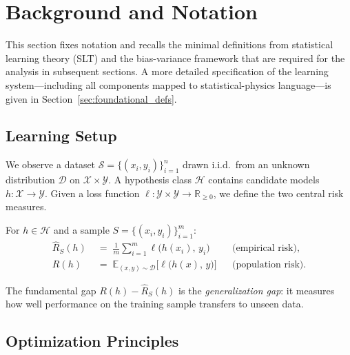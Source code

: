 \documentclass[
  journal=largetwo,
  simfonts=false,
  year=2025,
  volume=37,
]{cup-journal}
\begin{document}

\section{Background and Notation}\label{sec:background}

This section fixes notation and recalls the minimal definitions from statistical learning theory (SLT) \cite{Vapnik1999-VAPTNO,STL_Hajek_Maxim_2021} and the bias-variance framework that are required for the analysis in subsequent sections. A more detailed specification of the learning system---including all components mapped to statistical-physics language---is given in Section~\ref{sec:foundational_defs}.

\subsection{Learning Setup}

We observe a dataset $\mathcal{S}=\{(x_i,y_i)\}_{i=1}^{n}$ drawn i.i.d.\ from an unknown distribution $\mathcal{D}$ on $\mathcal{X}\times\mathcal{Y}$. A hypothesis class $\mathcal{H}$ contains candidate models $h:\mathcal{X}\to\mathcal{Y}$. Given a loss function $\ell:\mathcal{Y}\times\mathcal{Y}\to\mathbb{R}_{\geq 0}$, we define the two central risk measures.

\begin{definition}\label{def:risks}
For $h\in\mathcal{H}$ and a sample $S=\{(x_i,y_i)\}_{i=1}^m$:
\begin{align}
    \hat{R}_{S}(h) &\;=\; \frac{1}{m}\sum_{i=1}^{m}\ell\bigl(h(x_i),\,y_i\bigr)
        & &\text{(empirical risk),} \label{eq:emp_risk}\\[4pt]
    R(h) &\;=\; \mathbb{E}_{(x,y)\sim\mathcal{D}}\bigl[\ell\bigl(h(x),\,y\bigr)\bigr]
        & &\text{(population risk).} \label{eq:pop_risk}
\end{align}
\end{definition}

The fundamental gap $R(h)-\hat{R}_S(h)$ is the \textit{generalization gap}: it measures how well performance on the training sample transfers to unseen data.

\subsection{Optimization Principles}
\end{document}
